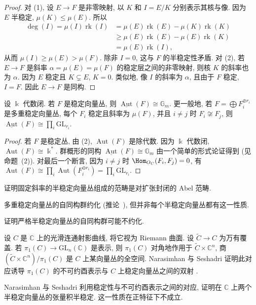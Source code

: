\begin{proof}
对 (1), 设 $E\to F$ 是非零映射, 以 $K$ 和 $I=E/K$ 分别表示其核与像. 因为 $E$ 半稳定, $\mu(K)\leq\mu(E)$. 所以
\[
\begin{aligned}
\deg(I)=\mu(I)\operatorname{rk}(I)&=\mu(E)\operatorname{rk}(E)-\mu(K)\operatorname{rk}(K)\\
&\geq\mu(E)\operatorname{rk}(E)-\mu(E)\operatorname{rk}(K)\\
&=\mu(E)\operatorname{rk}(I),
\end{aligned}
\]
从而 $\mu(I)\geq\mu(E)>\mu(F)$. 除非 $I=0$, 这与 $F$ 的半稳定性矛盾. 对 (2), 若 $E\to F$ 是斜率 $\alpha=\mu(E)=\mu(F)$ 的稳定层之间的非零映射, 则核 $K$ 的斜率也为 $\alpha$. 因为 $E$ 稳定且 $K\subsetneq E$, $K=0$. 类似地, 像 $I$ 的斜率为 $\alpha$, 且由于 $F$ 稳定, $I=F$. 因此 $E\to F$ 是同构.
\end{proof}
\begin{corollary}\label{src:9.1.16}
设 $\Bbbk$ 代数闭. 若 $F$ 是稳定向量丛, 则 $\underline{\operatorname{Aut}}(F)\cong\mathbb G_m$. 更一般地, 若 $F=\bigoplus F_i^{\oplus r_i}$ 是多重稳定向量丛, 每个 $F_i$ 稳定且斜率为 $\mu(F)$, 并且 $i\ne j$ 时 $F_i\not\cong F_j$, 则 $\underline{\operatorname{Aut}}(F)\cong\prod_i\mathrm{GL}_{r_i}$.
\end{corollary}
\begin{proof}
若 $F$ 是稳定丛, 由 (2), $\operatorname{Aut}(F)$ 是除代数. 因为 $\Bbbk$ 代数闭, $\operatorname{Aut}(F)\cong\Bbbk^*$. 群概形的同构 $\underline{\operatorname{Aut}}(F)\cong\mathbb G_m$ 由一个简单的形式论证得到 (见命题~(2)). 对最后一个断言, 因为 $i\ne j$ 时 $\Hom_{\mathcal O_C}(F_i,F_j)=0$, 有 $\operatorname{Aut}(F)\cong\prod_i\operatorname{Aut}(F_i^{\oplus r_i})=\prod_i\mathrm{GL}_{r_i}$.
\end{proof}
\begin{exercise}[有益练习, 简单]\label{src:9.1.17}
证明固定斜率的半稳定向量丛组成的范畴是对扩张封闭的 Abel 范畴.
\end{exercise}
多重稳定向量丛的自同构群约化 (推论~), 但并非每个半稳定向量丛都有这一性质.
\begin{exercise}[中等]\label{src:9.1.18}
证明严格半稳定向量丛的自同构群可能不约化.
\end{exercise}
\begin{remark}\label{src:9.1.19}
设 $C$ 是 $\mathbb C$ 上的光滑连通射影曲线, 将它视为 Riemann 曲面. 设 $\widetilde C\to C$ 为万有覆盖. 若 $\pi_1(C)\to\mathrm{GL}_n(\mathbb C)$ 是表示, 则 $\pi_1(C)$ 对角地作用于 $\widetilde C\times\mathbb C^n$, 商 $(\widetilde C\times\mathbb C^n)/\pi_1(C)$ 是 $C$ 上某向量丛的全空间. Narasimhan 与 Seshadri 证明此对应诱导 $\pi_1(C)$ 的不可约酉表示与 $C$ 上稳定向量丛之间的双射 \cite{NS65}.
\end{remark}
\begin{remark}[张量积下的半稳定性]\label{src:9.1.20}
Narasimhan 与 Seshadri 利用稳定性与不可约酉表示之间的对应, 证明在 $\mathbb C$ 上两个半稳定向量丛的张量积半稳定. 这一性质在正特征下不成立.
\end{remark}
